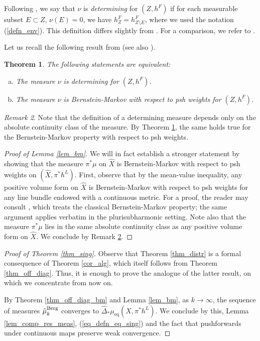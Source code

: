\documentclass[12pt]{article}
\numberwithin{equation}{section}
\theoremstyle{theorem}
\newtheorem{thm}{Theorem}[section]
\theoremstyle{definition}
\theoremstyle{remark}
\newtheorem{rem}[thm]{Remark}
\begin{document}
	Following \cite{BermanBouckBalls}, we say that $\nu$ is \textit{determining} for $(Z, h^F)$ if for each measurable subset $E \subset Z$, $\nu(E) = 0$, we have $h^F_{Z} = h^F_{Z \setminus E}$, where we used the notation (\ref{defn_env}).
	This definition differs slightly from \cite{SiciakDetermMeas}. 
	For a comparison, we refer to \cite[Proposition 3.6]{FinEigToepl}.
	\par 
	Let us recall the following result from \cite[Theorem 1.14]{BerBoucNys} (see also \cite[Theorems 5.1 and 5.2]{SiciakDetermMeas}).
	\begin{thm}\label{thm_bbwn_determining}
		The following statements are equivalent: 
		\begin{enumerate}[a)]
			\item The measure $\nu$ is determining for $(Z, h^F)$.
			\item The measure $\nu$ is Bernstein-Markov with respect to psh weights for $(Z, h^F)$.
		\end{enumerate}
	\end{thm}
	\begin{rem}\label{rem_equiv_class}
		Note that the definition of a determining measure depends only on the absolute continuity class of the measure. By Theorem \ref{thm_bbwn_determining}, the same holds true for the Bernstein-Markov property with respect to psh weights.
	\end{rem}
	\begin{proof}[Proof of Lemma \ref{lem_bm}]
		We will in fact establish a stronger statement by showing that the measure $\pi^* \mu$ on $\hat{X}$ is Bernstein-Markov with respect to psh weights on $(\hat{X}, \pi^* h^L)$.  
		First, observe that by the mean-value inequality, any positive volume form on $\hat{X}$ is Bernstein-Markov with respect to psh weights for any line bundle endowed with a continuous metric.  
		For a proof, the reader may consult \cite[Lemma 2.2]{BermanBouckBalls}, which treats the classical Bernstein-Markov property; the same argument applies verbatim in the plurisubharmonic setting.  
		Note also that the measure $\pi^* \mu$ lies in the same absolute continuity class as any positive volume form on $\hat{X}$.  
		We conclude by Remark \ref{rem_equiv_class}.
	\end{proof}
	\begin{proof}[Proof of Theorem \ref{thm_sing}]
		Observe that Theorem \ref{thm_distr} is a formal consequence of Theorem \ref{cor_alg}, which itself follows from Theorem \ref{thm_off_diag}. 
		Thus, it is enough to prove the analogue of the latter result, on which we concentrate from now on.
		\par 
		By Theorem \ref{thm_off_diag_bm} and Lemma \ref{lem_bm}, as $k \to \infty$, the sequence of measures $\hat{\mu}_k^{\rm{Berg}}$ converges to $\hat{\Delta}_* \mu_{\mathrm{eq}}(\hat{X}, \pi^* h^L)$.
		We conclude by this, Lemma \ref{lem_comp_res_meas}, (\ref{eq_defn_eq_sing}) and the fact that pushforwards under continuous maps preserve weak convergence.
	\end{proof}



		

\Addresses
\end{document}
